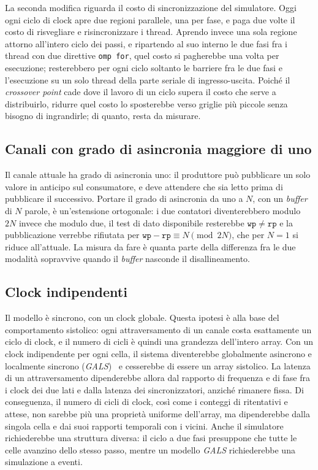 La seconda modifica riguarda il costo di sincronizzazione del simulatore. Oggi
ogni ciclo di clock apre due regioni parallele, una per fase, e paga due volte
il costo di risvegliare e risincronizzare i thread. Aprendo invece una sola
regione attorno all'intero ciclo dei passi, e ripartendo al suo interno le due
fasi fra i thread con due direttive \texttt{omp for}, quel costo si pagherebbe
una volta per esecuzione; resterebbero per ogni ciclo soltanto le barriere fra
le due fasi e l'esecuzione su un solo thread della parte seriale di
ingresso-uscita. Poiché il \emph{crossover point} cade dove il lavoro di un ciclo supera il
costo che serve a distribuirlo, ridurre quel costo lo sposterebbe verso griglie
più piccole senza bisogno di ingrandirle; di quanto, resta da misurare.

\subsection{Canali con grado di asincronia maggiore di uno}

Il canale attuale ha grado di asincronia uno: il produttore può pubblicare un
solo valore in anticipo sul consumatore, e deve attendere che sia letto prima di
pubblicare il successivo. Portare il grado di asincronia da uno a $N$, con un
\emph{buffer} di $N$ parole, è un'estensione ortogonale: i due contatori
diventerebbero modulo $2N$ invece che modulo due, il test di dato disponibile
resterebbe $\mathtt{wp} \neq \mathtt{rp}$ e la pubblicazione verrebbe rifiutata per
$\mathtt{wp} - \mathtt{rp} \equiv N \pmod{2N}$, che per $N = 1$ si riduce
all'attuale. La misura da fare è quanta parte della differenza fra le due
modalità sopravvive quando il \emph{buffer} nasconde il disallineamento.

\subsection{Clock indipendenti}

Il modello è sincrono, con un clock globale. Questa ipotesi è alla base del
comportamento sistolico: ogni attraversamento di un canale costa esattamente
un ciclo di clock, e il numero di cicli è quindi una grandezza dell'intero
array. Con un clock indipendente per ogni cella, il sistema diventerebbe
globalmente asincrono e localmente sincrono (\emph{GALS})~\cite{Chapiro1984} e cesserebbe di
essere un array sistolico. La latenza di un attraversamento dipenderebbe allora
dal rapporto di frequenza e di fase fra i clock dei due lati e dalla latenza
dei sincronizzatori, anziché rimanere fissa. Di conseguenza, il numero di cicli
di clock, così come i conteggi di ritentativi e attese, non sarebbe più una
proprietà uniforme dell'array, ma dipenderebbe dalla singola cella e dai suoi
rapporti temporali con i vicini. Anche il simulatore richiederebbe una
struttura diversa: il ciclo a due fasi presuppone che tutte le celle avanzino
dello stesso passo, mentre un modello \emph{GALS} richiederebbe una simulazione
a eventi.

